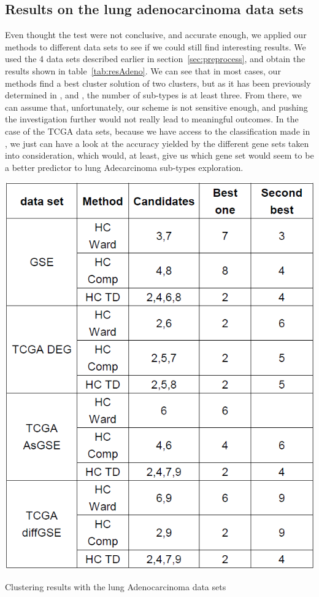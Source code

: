 \documentclass[twocolumn]{article}
\begin{document}
\subsection{Results on the lung adenocarcinoma data sets}

Even thought the test were not conclusive, and accurate enough, we applied our methods to different data sets to see if we could still find interesting results.
We used the 4 data sets described earlier in section~\ref{sec:preprocess}, and obtain the results shown in table~\ref{tab:resAdeno}.
We can see that in most cases, our methods find a best cluster solution of two clusters, but as it has been previously determined in \cite{hayes}, \cite{wilk} and \cite{TCGA}, the number of sub-types is at least three. From there, we can assume that, unfortunately, our scheme is not sensitive enough, and pushing the investigation further would not really lead to meaningful outcomes.
In the case of the TCGA data sets, because we have access to the classification made in \cite{TCGA}, we just can have a look at the accuracy yielded by the different gene sets taken into consideration, which would, at least, give us which gene set would seem to be a better predictor to lung Adecarcinoma sub-types exploration.
\begin{table}[!]
    \centering
    \includegraphics[scale=0.4]{img/ResultsAdeno.png}
    \caption{Clustering results with the lung Adenocarcinoma data sets}
    \label{tab:resAdeno}
\end{table}
\end{document}
